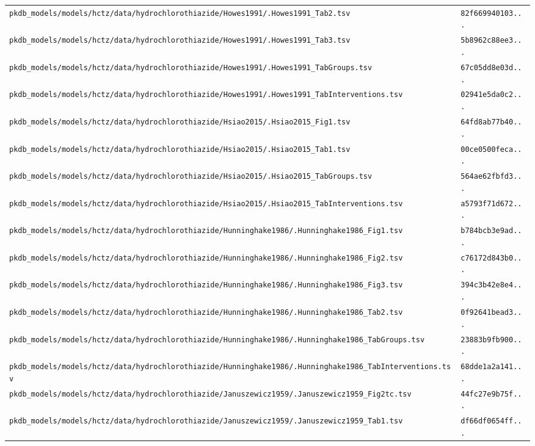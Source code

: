 \documentclass{article}
\begin{document}
\begin{longtable}{ll}
\texttt{pkdb\_models/models/hctz/data/hydrochlorothiazide/Howes1991/.Howes1991\_Tab2.tsv} & \texttt{82f669940103...} \\
\texttt{pkdb\_models/models/hctz/data/hydrochlorothiazide/Howes1991/.Howes1991\_Tab3.tsv} & \texttt{5b8962c88ee3...} \\
\texttt{pkdb\_models/models/hctz/data/hydrochlorothiazide/Howes1991/.Howes1991\_TabGroups.tsv} & \texttt{67c05dd8e03d...} \\
\texttt{pkdb\_models/models/hctz/data/hydrochlorothiazide/Howes1991/.Howes1991\_TabInterventions.tsv} & \texttt{02941e5da0c2...} \\
\texttt{pkdb\_models/models/hctz/data/hydrochlorothiazide/Hsiao2015/.Hsiao2015\_Fig1.tsv} & \texttt{64fd8ab77b40...} \\
\texttt{pkdb\_models/models/hctz/data/hydrochlorothiazide/Hsiao2015/.Hsiao2015\_Tab1.tsv} & \texttt{00ce0500feca...} \\
\texttt{pkdb\_models/models/hctz/data/hydrochlorothiazide/Hsiao2015/.Hsiao2015\_TabGroups.tsv} & \texttt{564ae62fbfd3...} \\
\texttt{pkdb\_models/models/hctz/data/hydrochlorothiazide/Hsiao2015/.Hsiao2015\_TabInterventions.tsv} & \texttt{a5793f71d672...} \\
\texttt{pkdb\_models/models/hctz/data/hydrochlorothiazide/Hunninghake1986/.Hunninghake1986\_Fig1.tsv} & \texttt{b784bcb3e9ad...} \\
\texttt{pkdb\_models/models/hctz/data/hydrochlorothiazide/Hunninghake1986/.Hunninghake1986\_Fig2.tsv} & \texttt{c76172d843b0...} \\
\texttt{pkdb\_models/models/hctz/data/hydrochlorothiazide/Hunninghake1986/.Hunninghake1986\_Fig3.tsv} & \texttt{394c3b42e8e4...} \\
\texttt{pkdb\_models/models/hctz/data/hydrochlorothiazide/Hunninghake1986/.Hunninghake1986\_Tab2.tsv} & \texttt{0f92641bead3...} \\
\texttt{pkdb\_models/models/hctz/data/hydrochlorothiazide/Hunninghake1986/.Hunninghake1986\_TabGroups.tsv} & \texttt{23883b9fb900...} \\
\texttt{pkdb\_models/models/hctz/data/hydrochlorothiazide/Hunninghake1986/.Hunninghake1986\_TabInterventions.tsv} & \texttt{68dde1a2a141...} \\
\texttt{pkdb\_models/models/hctz/data/hydrochlorothiazide/Januszewicz1959/.Januszewicz1959\_Fig2tc.tsv} & \texttt{44fc27e9b75f...} \\
\texttt{pkdb\_models/models/hctz/data/hydrochlorothiazide/Januszewicz1959/.Januszewicz1959\_Tab1.tsv} & \texttt{df66df0654ff...} \\

\end{longtable}
\end{document}
